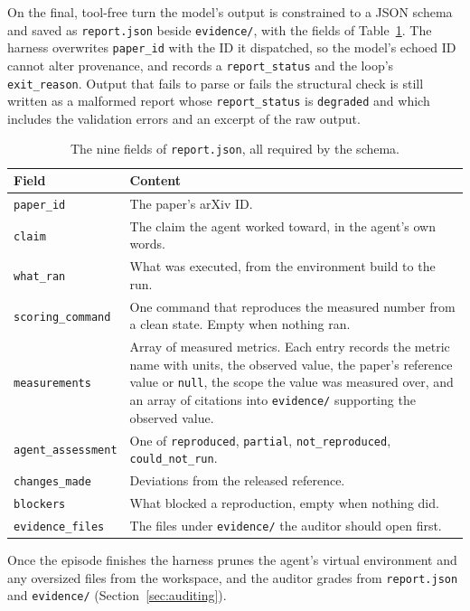 On the final, tool-free turn the model's output is constrained to a JSON
schema and saved as \texttt{report.json} beside \texttt{evidence/}, with the
fields of Table~\ref{tab:report-schema}. The harness overwrites
\texttt{paper\_id} with the ID it dispatched, so the model's echoed ID cannot
alter provenance, and records a
\texttt{report\_status} and the loop's
\texttt{exit\_reason}. Output that fails to parse or fails the structural
check is still written as a malformed report whose \texttt{report\_status} is
\texttt{degraded} and which includes the validation errors and an excerpt of
the raw output.

\begin{table}[ht]
\centering
\small
\renewcommand{\arraystretch}{1.15}
\begin{tabular}{@{}l>{\raggedright\arraybackslash}p{9.2cm}@{}}
\toprule
Field & Content \\
\midrule
\texttt{paper\_id} & The paper's arXiv ID. \\
\texttt{claim} & The claim the agent worked toward, in the agent's own words. \\
\texttt{what\_ran} & What was executed, from the environment build to
the run. \\
\texttt{scoring\_command} & One command that reproduces the measured number from
a clean state. Empty when nothing ran. \\
\texttt{measurements} & Array of measured metrics. Each entry records the metric
name with units, the observed value, the paper's reference value or
\texttt{null}, the scope the value was measured over, and an array of citations
into \texttt{evidence/} supporting the observed value. \\
\texttt{agent\_assessment} & One of \texttt{reproduced}, \texttt{partial},
\texttt{not\_reproduced}, \texttt{could\_not\_run}. \\
\texttt{changes\_made} & Deviations from the released reference. \\
\texttt{blockers} & What blocked a reproduction, empty when nothing did. \\
\texttt{evidence\_files} & The files under \texttt{evidence/} the auditor should
open first. \\
\bottomrule
\end{tabular}
\caption{The nine fields of \texttt{report.json}, all required by the schema.}
\label{tab:report-schema}
\end{table}

Once the episode finishes the harness prunes the agent's virtual environment
and any oversized files from the workspace, and the auditor grades from
\texttt{report.json} and \texttt{evidence/} (Section~\ref{sec:auditing}).


